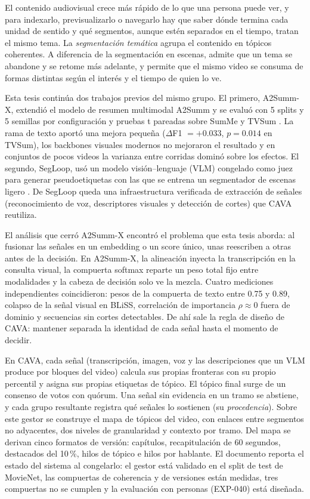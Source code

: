 
El contenido audiovisual crece más rápido de lo que una persona puede ver, y para indexarlo,
previsualizarlo o navegarlo hay que saber dónde termina cada unidad de sentido y qué
segmentos, aunque estén separados en el tiempo, tratan el mismo tema. La \emph{segmentación
temática} agrupa el contenido en tópicos coherentes. A diferencia de la segmentación en
escenas, admite que un tema se abandone y se retome más adelante, y permite que el mismo
video se consuma de formas distintas según el interés y el tiempo de quien lo ve.

Esta tesis continúa dos trabajos previos del mismo grupo. El primero, A2Summ-X, extendió el
modelo de resumen multimodal A2Summ \cite{he2023a2summ} y se evaluó con 5 splits y 5 semillas
por configuración y pruebas t pareadas sobre SumMe y TVSum \cite{gygli2014summe,
song2015tvsum}. La rama de texto aportó una mejora pequeña ($\Delta$F1 $= +0.033$,
$p = 0.014$ en TVSum), los backbones visuales modernos no mejoraron el resultado y en
conjuntos de pocos videos la varianza entre corridas dominó sobre los efectos. El segundo, SegLoop,
usó un modelo visión--lenguaje (VLM) congelado \cite{bai2025qwen25vl} como juez para generar
pseudoetiquetas con las que se entrena un segmentador de escenas ligero \cite{mun2022bassl,
huang2020movienet}. De SegLoop queda una infraestructura verificada de extracción de señales
(reconocimiento de voz, descriptores visuales y detección de cortes) que CAVA reutiliza.

El análisis que cerró A2Summ-X encontró el problema que esta tesis aborda: al fusionar las
señales en un embedding o un score único, unas reescriben a otras antes de la decisión. En
A2Summ-X, la alineación inyecta la transcripción en la consulta visual, la compuerta softmax
reparte un peso total fijo entre modalidades y la cabeza de decisión solo ve la mezcla.
Cuatro mediciones independientes coincidieron: pesos de la compuerta de texto entre 0.75 y
0.89, colapso de la señal visual en BLiSS, correlación de importancia $\rho \approx 0$ fuera
de dominio y secuencias sin cortes detectables. De ahí sale la regla de diseño de CAVA:
mantener separada la identidad de cada señal hasta el momento de decidir.

En CAVA, cada señal (transcripción, imagen, voz y las descripciones que un VLM produce por
bloques del video) calcula sus propias fronteras con su propio percentil y asigna sus propias
etiquetas de tópico. El tópico final surge de un consenso de votos con quórum. Una señal sin
evidencia en un tramo se abstiene, y cada grupo resultante registra qué señales lo sostienen
(su \emph{procedencia}). Sobre este gestor se construye el mapa de tópicos del video, con
enlaces entre segmentos no adyacentes, dos niveles de granularidad y contexto por tramo. Del
mapa se derivan cinco formatos de versión: capítulos, recapitulación de 60 segundos,
destacados del 10\,\%, hilos de tópico e hilos por hablante. El documento reporta el estado
del sistema al congelarlo: el gestor está validado en el split de test de MovieNet, las
compuertas de coherencia y de versiones están medidas, tres compuertas no se cumplen y la
evaluación con personas (EXP-040) está diseñada.

